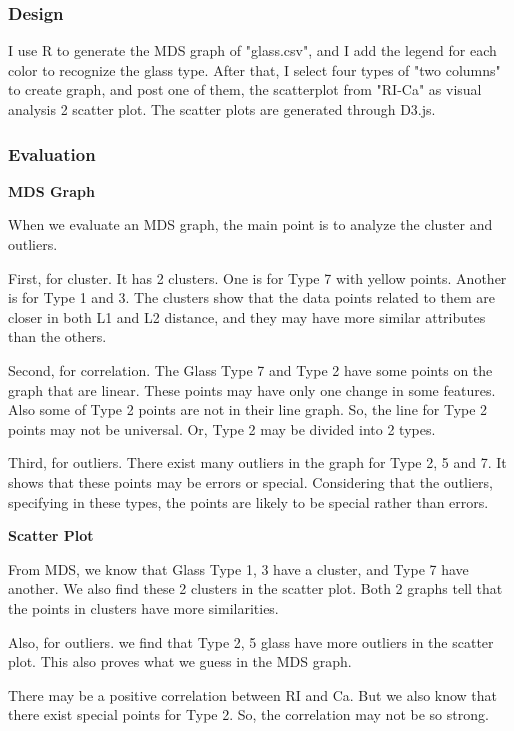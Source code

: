 \documentclass{article}
\begin{document}
\subsubsection{Design}

\indent

I use R to generate the MDS graph of "glass.csv", and I add the legend for each color to recognize the glass type. After that, I select four types of "two columns" to create graph, and post one of them, the scatterplot from "RI-Ca" as visual analysis 2 scatter plot. The scatter plots are generated through D3.js.

\subsubsection{Evaluation}

\textbf{MDS Graph}

When we evaluate an MDS graph, the main point is to analyze the cluster and outliers.

First, for cluster. It has 2 clusters. One is for Type 7 with yellow points. Another is for Type 1 and 3. The clusters show that the data points related to them are closer in both L1 and L2 distance, and they may have more similar attributes than the others.

Second, for correlation. The Glass Type 7 and Type 2 have some points on the graph that are linear. These points may have only one change in some features. Also some of Type 2 points are not in their line graph. So,  the line for Type 2 points may not be universal. Or, Type 2 may be divided into 2 types.

Third, for outliers. There exist many outliers in the graph for Type 2, 5 and 7. It shows that these points may be errors or special. Considering that the outliers, specifying in these types, the points are likely to be special rather than errors.

\bigskip

\noindent\textbf{Scatter Plot}

From MDS, we know that Glass Type 1, 3 have a cluster, and Type 7 have another. We also find these 2 clusters in the scatter plot. Both 2 graphs tell that the points in clusters have more similarities.

Also, for outliers. we find that Type 2, 5 glass have more outliers in the scatter plot. This also proves what we guess in the MDS graph.

There may be a positive correlation between RI and Ca. But we also know that there exist special points for Type 2. So, the correlation may not be so strong.
\end{document}
